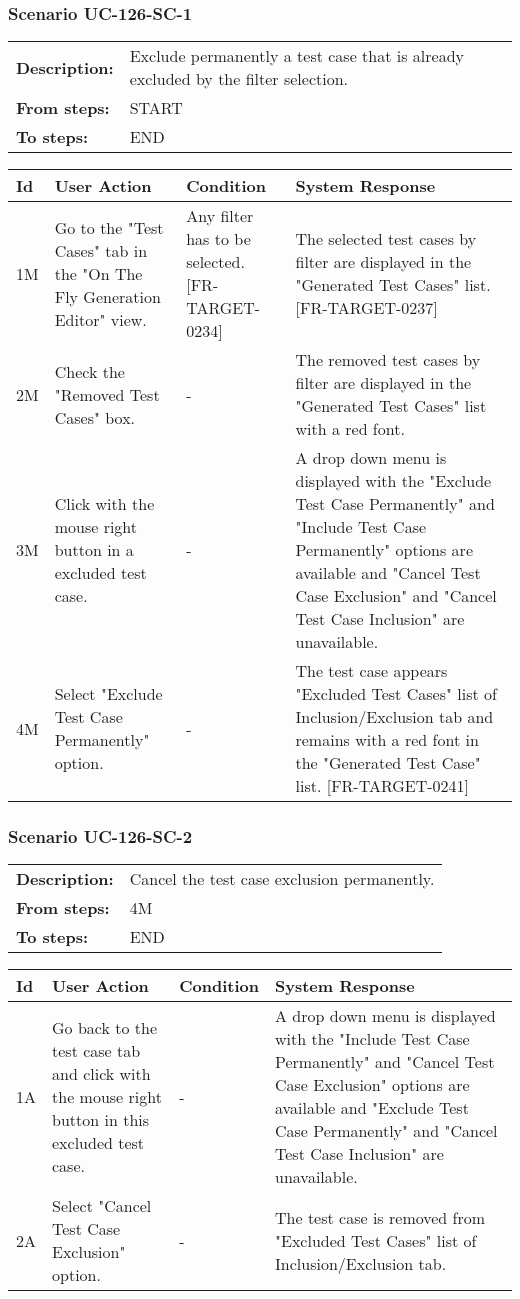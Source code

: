 \documentclass[a4paper,11pt]{article}
\newcommand{\bl}{\\ \hline}
\begin{document}
\subsubsection*{Scenario UC-126-SC-1}
\begin{tabular}{p{1in}p{4in}}
{\bf Description:} & Exclude permanently a test case that is already excluded by the filter selection. \\
{\bf From steps:} & START \\
{\bf To steps:} & END \\
\end{tabular}
 
\begin{tabular}{|p{0.8in}|p{1.6in}|p{1.6in}|p{1.6in}|}
\hline
Id & User Action & Condition & System Response  \bl 
1M & Go to the "Test Cases" tab in the "On The Fly Generation Editor" view. & Any filter has to be selected. [FR-TARGET-0234] & The selected test cases by filter are displayed in the "Generated Test Cases" list. [FR-TARGET-0237] \bl 
2M & Check the "Removed Test Cases" box. & - & The removed test cases by filter are displayed in the "Generated Test Cases" list with a red font. \bl 
3M & Click with the mouse right button in a excluded test case. & - & A drop down menu is displayed with the "Exclude Test Case Permanently" and "Include Test Case Permanently" options are available and "Cancel Test Case Exclusion" and "Cancel Test Case Inclusion" are unavailable. \bl 
4M & Select "Exclude Test Case Permanently" option. & - & The test case appears "Excluded Test Cases" list of Inclusion/Exclusion tab and remains with a red font in the "Generated Test Case" list. [FR-TARGET-0241] \bl 
\end{tabular}
\subsubsection*{Scenario UC-126-SC-2}
\begin{tabular}{p{1in}p{4in}}
{\bf Description:} & Cancel the test case exclusion permanently. \\
{\bf From steps:} & 4M \\
{\bf To steps:} & END \\
\end{tabular}
 
\begin{tabular}{|p{0.8in}|p{1.6in}|p{1.6in}|p{1.6in}|}
\hline
Id & User Action & Condition & System Response  \bl 
1A & Go back to the test case tab and click with the mouse right button in this excluded test case. & - & A drop down menu is displayed with the "Include Test Case Permanently" and "Cancel Test Case Exclusion" options are available and "Exclude Test Case Permanently" and "Cancel Test Case Inclusion" are unavailable. \bl 
2A & Select "Cancel Test Case Exclusion" option. & - & The test case is removed from "Excluded Test Cases" list of Inclusion/Exclusion tab. \bl 
\end{tabular}
\end{document}
